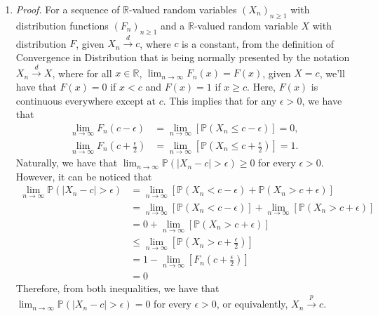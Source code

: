 \documentclass[a4paper,10pt]{article}
\begin{document}
\begin{enumerate}
\pagebreak
\item \textit{Proof.} For a sequence of $\mathbb{R}$-valued random variables $\left(X_n\right)_{n \geq 1}$ with distribution functions $\left(F_n\right)_{n \geq 1}$ and a $\mathbb{R}$-valued random variable $X$ with distribution $F$, given $X_n \overset{d}{\to} c$, where $c$ is a constant, from the definition of Convergence in Distribution that is being normally presented by the notation $X_n \overset{d}{\to} X$, where for all $x \in \mathbb{R}$, $\displaystyle \lim_{n \to \infty} F_n(x) = F(x)$, given $X=c$, we'll have that $F(x) = 0$ if $x < c$ and $F(x) = 1$ if $x \geq c$.
Here, $F(x)$ is continuous everywhere except at $c$. 
This implies that for any $\epsilon > 0$, we have that
\begin{equation*}
	\begin{aligned}
		\lim_{n \to \infty} F_n(c-\epsilon) &= \lim_{n \to \infty} \left[\mathbb{P}\!\left( X_n \leq c - \epsilon\right)\right] = 0, \\
		\lim_{n \to \infty} F_n\!\left(c+\frac{\epsilon}{2}\right) &= \lim_{n \to \infty} \left[\mathbb{P}\!\left( X_n \leq c + \frac{\epsilon}{2} \right)\right] = 1. 
	\end{aligned}
\end{equation*}
Naturally, we have that $\displaystyle \lim_{n \to \infty}\mathbb{P}\!\left(\left| X_n - c \right|> \epsilon\right) \geq 0$ for every $\epsilon > 0$.
However, it can be noticed that
\begin{equation*}
	\begin{aligned}
		\lim_{n \to \infty} \mathbb{P}\!\left(\left| X_n - c \right|> \epsilon\right) &= \lim_{n \to \infty} \left[\mathbb{P}\!\left( X_n < c - \epsilon\right) + \mathbb{P}\!\left( X_n > c + \epsilon\right)\right] \\
		&= \lim_{n \to \infty}\left[\mathbb{P}\!\left( X_n < c - \epsilon\right)\right] + \lim_{n \to \infty}\left[\mathbb{P}\!\left( X_n > c + \epsilon\right)\right] \\
		&= 0 + \lim_{n \to \infty} \left[\mathbb{P}\!\left( X_n > c + \epsilon\right)\right] \\
		&\leq \lim_{n \to \infty}\left[\mathbb{P}\!\left( X_n > c + \frac{\epsilon}{2}\right)\right] \\
		&= 1 - \lim_{n \to \infty} \left[F_n\!\left(c+\frac{\epsilon}{2}\right)\right] \\
		&= 0
	\end{aligned}
\end{equation*}
Therefore, from both inequalities, we have that $\displaystyle \lim_{n \to \infty} \mathbb{P}\!\left(\left| X_n - c \right|> \epsilon\right) = 0$ for every $\epsilon > 0$, or equivalently, $X_n \overset{p}{\to} c$. \qedsymbol
\end{enumerate}
\end{document}

